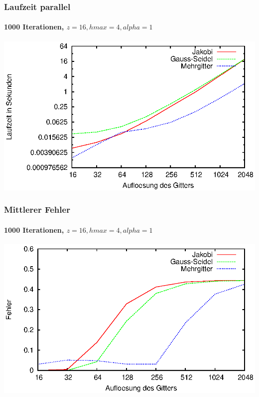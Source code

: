 \documentclass{beamer}
\begin{document}
\begin{frame}
    \frametitle{Laufzeit parallel}
    \framesubtitle{1000 Iterationen, $z=16, hmax=4, alpha=1$}
    \includegraphics[width=\textwidth]{plots/laufzeitenparallel}
\end{frame}

\begin{frame}
    \frametitle{Mittlerer Fehler}
    \framesubtitle{1000 Iterationen, $z=16, hmax=4, alpha=1$}
    \includegraphics[width=\textwidth]{plots/fehlermittel}
\end{frame}
\end{document}
